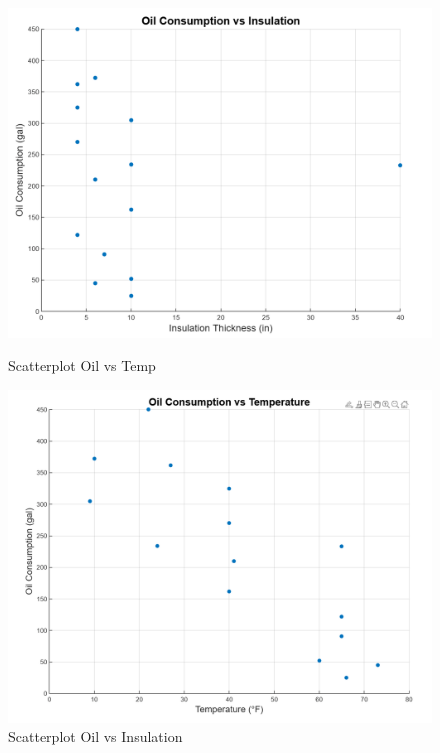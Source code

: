 \documentclass[12pt]{article}
\begin{document}
\begin{figure}[H]
    \centering
    \begin{minipage}{0.48\textwidth}
        \centering
        \includegraphics[width=\textwidth]{8.png}
        \caption{Scatterplot Oil vs Temp}
        \label{fig:oil_vs_temp}
    \end{minipage}
    \hfill %
    \begin{minipage}{0.48\textwidth}
        \centering
        \includegraphics[width=\textwidth]{9.png}
        \caption{Scatterplot Oil vs Insulation}
        \label{fig:oil_vs_insulation}
    \end{minipage}
\end{figure}
\end{document}
